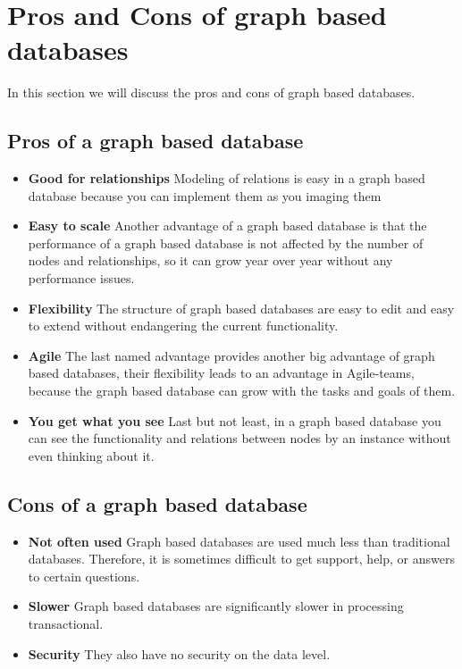 
\section{Pros and Cons of graph based databases}\label{sec:pros-and-cons-of-graph-based-databases}
In this section we will discuss the pros and cons of graph based databases.
\subsection{Pros of a graph based database}\label{subsec:pros-of-a-graph-based-database}\label{subsec:pros}
\begin{itemize}
    \item \textbf{Good for relationships} Modeling of relations is easy in a graph based database because you can implement them as you imaging them
    \item \textbf{Easy to scale} Another advantage of a graph based database is that the performance of a graph based database is not affected by the number of nodes and relationships, so it can grow year over year without any performance issues.
    \item \textbf{Flexibility} The structure of graph based databases are easy to edit and easy to extend without endangering the current functionality.
    \item \textbf{Agile} The last named advantage provides another big advantage of graph based databases, their flexibility leads to an advantage in Agile-teams, because the graph based database can grow with the tasks and goals of them.
    \item \textbf{You get what you see} Last but not least, in a graph based database you can see the functionality and relations between nodes by an instance without even thinking about it.
\end{itemize}
\subsection{Cons of a graph based database}\label{subsec:cons-of-a-graph-based-database}\label{subsec:cons}
\begin{itemize}
    \item \textbf{Not often used} Graph based databases are used much less than traditional databases. Therefore, it is sometimes difficult to get support, help, or answers to certain questions.
    \item \textbf{Slower} Graph based databases are significantly slower in processing transactional.
    \item  \textbf{Security} They also have no security on the data level.
\end{itemize}

